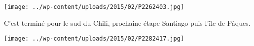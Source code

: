  

\begin{center} \texttt{[image: ../wp-content/uploads/2015/02/P2262403.jpg]} \end{center}



 C'est terminé pour le sud du Chili, prochaine étape Santiago puis l'île de Pâques.

 

\begin{center} \texttt{[image: ../wp-content/uploads/2015/02/P2282417.jpg]} \end{center}



 

 

 

 

 

 

 

 

 

 

 

 

 

 

 


 
 
